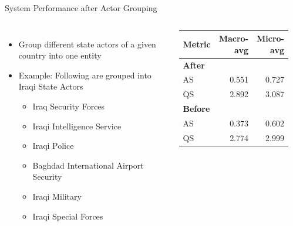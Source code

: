 \begin{frame}{System Performance after Actor Grouping}
\begin{columns}
\begin{itemize}
    \item Group different state actors of a given country into one entity
    \item Example: Following are grouped into Iraqi State Actors
    \begin{itemize}
        \item Iraq Security Forces
        \item Iraqi Intelligence Service
        \item Iraqi Police
        \item Baghdad International Airport Security
        \item Iraqi Military
        \item Iraqi Special Forces
    \end{itemize}
\end{itemize}
\begin{table}
\centering
\begin{tabular}{lrr}
\toprule
       Metric &    Macro-avg &    Micro-avg \\
\midrule
\textbf{After} & & \\
       AS &     0.551 &     0.727 \\
       QS &     2.892 &     3.087 \\
       \midrule
       \textbf{Before} & & \\
        AS &     0.373 &     0.602 \\
        QS &     2.774 &     2.999 \\
\bottomrule
\end{tabular}
\label{tab:mlgrouped}
\end{table}
\end{columns}
\end{frame}

